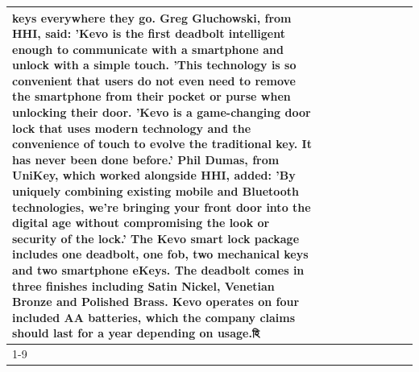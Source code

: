 \begin{table}[H]
\begin{tabular}{lllrlllll}
keys everywhere they go. Greg Gluchowski, from HHI, said: 'Kevo is the first deadbolt intelligent enough to communicate with a smartphone and unlock with a simple touch. 'This technology is so convenient that users do not even need to remove the smartphone from their pocket or purse when unlocking their door. 'Kevo is a game-changing door lock that uses modern technology and the convenience of touch to evolve the traditional key. It has never been done before.' Phil Dumas, from UniKey, which worked alongside HHI, added: 'By uniquely combining existing mobile and Bluetooth technologies, we’re bringing your front door into the digital age without compromising the look or security of the lock.' The Kevo smart lock package includes one deadbolt, one fob, two mechanical keys and two smartphone eKeys. The deadbolt comes in three finishes including Satin Nickel, Venetian Bronze and Polished Brass. Kevo operates on four included AA batteries, which the company claims should last for a year depending on usage.হি \\
\cline{1-9}

\end{tabular}
\end{table}
